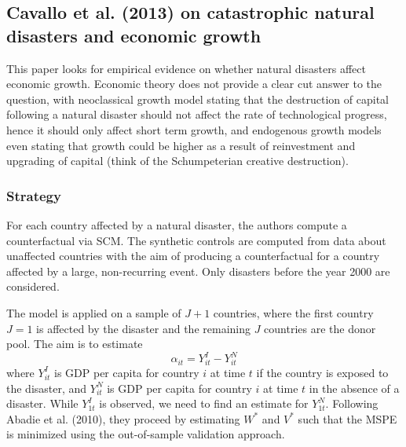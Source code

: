 \documentclass[12pt,a4paper,draft]{article}
\begin{document}
\subsection{Cavallo et al. (2013) on catastrophic natural disasters and economic growth}
This paper looks for empirical evidence on whether natural disasters affect economic growth.
Economic theory does not provide a clear cut answer to the question, with neoclassical 
growth model stating that the destruction of capital following a natural disaster should 
not affect the rate of technological progress, hence it should only affect short term 
growth, and endogenous growth models even stating that growth could be higher as a result 
of reinvestment and upgrading of capital (think of the Schumpeterian creative destruction).

\subsubsection*{Strategy}
For each country affected by a natural disaster, the authors compute a counterfactual 
via SCM. The synthetic controls are computed from data about unaffected countries with 
the aim of producing a counterfactual for a country affected by a large, non-recurring 
event. Only disasters before the year 2000 are considered.

The model is applied on a sample of $J+1$ countries, where the first country $J=1$ is 
affected by the disaster and the remaining $J$ countries are the donor pool. The aim is 
to estimate $$\alpha_{it} = Y^I_{it} - Y^N_{it}$$ where $Y^I_{it}$ is GDP per capita 
for country $i$ at time $t$ if the country is exposed to the disaster, and $Y^N_{it}$ 
is GDP per capita for country $i$ at time $t$ in the absence of a disaster. 
While $Y^I_{1t}$ is observed, we need to find an estimate for $Y^N_{1t}$. 
Following Abadie et al. (2010), they proceed by estimating $W^*$ and $V^*$ such that 
the MSPE is minimized using the out-of-sample validation approach. 
\end{document}
